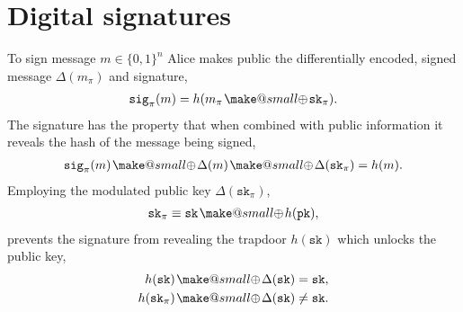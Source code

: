 \documentclass[twocolumn, aps, amsmath, amssymb, nofootinbib, superscriptaddress, longbibliography, doublefloatfix, table-of-contents, eqsecnum, rmp]{revtex4-2}
\makeatletter
\newcommand{\soplus}{{{\hspace{1pt}}{\mathbin{\mathpalette\make@small{\mathbin\oplus}}}}{\hspace{1pt}}}
\newcommand{\make@small}[2]{%
  \vcenter{\hbox{%
    \scalebox{0.6}{$\m@th#1#2$}%
  }}%
}
\makeatother
\begin{document}
%
%
%

\section{Digital signatures}

To sign message \mbox{$m\in\{0,1\}^n$} Alice makes public the differentially encoded, signed message $\Delta(m_\pi)$ and signature,
\begin{align}
	 \mathtt{sig}_\pi(m) = h(m_\pi \soplus \mathtt{sk}_\pi).
\end{align}
The signature has the property that when combined with public information it reveals the hash of the message being signed,
\begin{align}
	 \mathtt{sig}_\pi(m) \soplus \Delta(m) \soplus \Delta(\mathtt{sk}_\pi) = h(m).
\end{align}
Employing the modulated public key $\Delta(\mathtt{sk}_\pi)$,
\begin{align}
	\mathtt{sk}_\pi \equiv \mathtt{sk} \soplus h(\mathtt{pk}),
\end{align}
prevents the signature from revealing the trapdoor $h(\mathtt{sk})$ which unlocks the public key,
\begin{align}
	h(\mathtt{sk}) \soplus \Delta(\mathtt{sk}) &= \mathtt{sk},\nonumber\\
	h(\mathtt{sk}_\pi) \soplus \Delta(\mathtt{sk}) &\neq \mathtt{sk}.
\end{align}

\end{document}
